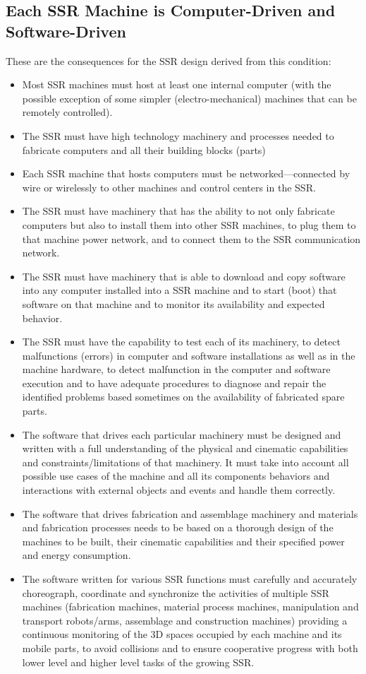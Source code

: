 \subsection[Each SSR Machine is Computer{}-Driven and
Software{}-Driven]{Each SSR Machine is Computer-Driven and
Software-Driven}

These are the consequences for
the SSR design derived from this condition:

\begin{itemize}
\item Most SSR machines must host at least one internal computer (with
the possible exception of some simpler (electro-mechanical) machines
that can be remotely controlled).
\item The SSR must have high technology machinery and processes needed
to fabricate computers and all their building blocks (parts)
\item Each SSR machine that hosts computers must be networked---connected 
by wire or wirelessly to other machines and control centers
in the SSR.
\item The SSR must have machinery that has the ability to not only
fabricate computers but also to install them into other SSR machines,
to plug them to that machine power network, and to connect them to
the SSR communication network.
\item The SSR must have machinery that is able to download and copy
software into any computer installed into a SSR machine and to start
(boot) that software on that machine and to monitor its availability
and expected behavior.
\item The SSR must have the capability to test each of its machinery, to
detect malfunctions (errors) in computer and software installations as
well as in the machine hardware, to detect malfunction in the computer
and software execution and to have adequate procedures to diagnose and
repair the identified problems based sometimes on the availability of
fabricated spare parts.
\item The software that drives each particular machinery must be
designed and written with a full understanding of the physical and
cinematic capabilities and constraints/limitations of that machinery.
It must take into account all possible use cases of the machine and all
its components behaviors and interactions with external objects and
events and handle them correctly.
\item The software that drives fabrication and assemblage machinery and
materials and fabrication processes needs to be based on a thorough
design of the machines to be built, their cinematic capabilities and
their specified power and energy consumption.
\item The software written for various SSR functions must carefully and
accurately choreograph, coordinate and synchronize the activities of
multiple SSR machines (fabrication machines, material process machines,
manipulation and transport robots/arms, assemblage and construction
machines) providing a continuous monitoring of the 3D spaces occupied
by each machine and its mobile parts, to avoid collisions and to ensure
cooperative progress with both lower level and higher level tasks of
the growing SSR.
\end{itemize}

